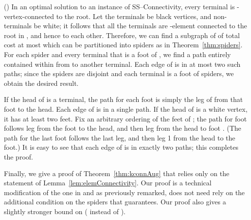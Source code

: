 \documentclass[11pt]{article}
\newcommand{\sskconn}{{\sc SS--Connectivity}}
\newenvironment{proofof}[1]{\smallskip\noindent{\bf Proof of #1:}}{\hspace*{\fill}\par}
\begin{document}
\begin{proofof}{Lemma~\ref{lem:elemConnectivity}}(\cite{ChuzhoyK08})
  In an optimal solution  to an instance of \sskconn, every
  terminal is -vertex-connected to the root. Let the terminals be
  black vertices, and non-terminals be white; it follows that all the
  terminals are -element connected to the root in , and hence to
  each other. Therefore, we can find a subgraph of  of total cost
  at most  which can be partitioned into spiders as in
  Theorem~\ref{thm:spiders}. For each spider  and every terminal
   that is a foot of , we find a path entirely contained within
   from  to another terminal. Each edge of  is in at most two
  such paths; since the spiders are disjoint and each terminal is a
  foot of  spiders, we obtain the desired result.

  If the head of  is a terminal, the path for each foot is simply
  the leg of  from that foot to the head. Each edge of  is in a
  single path. If the head of  is a white vertex, it has at least
  two feet. Fix an arbitrary ordering of the feet of ; the path for
  foot  follows leg  from the foot to the head, and then leg
   from the head to foot . (The path for the last foot
  follows the last leg, and then leg 1 from the head to the foot.)
  It is easy to see that each edge of  is in exactly two paths;
  this completes the proof.
\end{proofof}

Finally, we give a proof of Theorem~\ref{thm:kconnAug} that relies
only on the statement of Lemma~\ref{lem:elemConnectivity}. Our
proof is a technical modification of the one in \cite{ChuzhoyK08} and
as previously remarked, does not need rely on the additional condition
on the spiders that \cite{ChuzhoyK08} guarantees. Our proof
also gives a slightly stronger bound on  ( instead of ).
\end{document}
